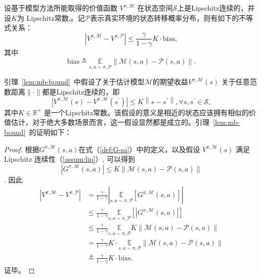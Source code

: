 \begin{lemma}\label{lem:mb-bound}
设基于模型方法所能取得的价值函数 ${V}^{\pi,\mathcal{M}}$ 在状态空间$\mathcal{S}$上是Lipschitz连续的，并设$K$为 Lipschitz常数,。记$\mathcal{P}$表示真实环境的状态转移概率分布，则有如下的不等式关系：
\begin{equation}
\left|{V}^{\pi, \mathcal{M}}-{V}^{\pi, \mathcal{P}}\right| \leq\frac{\gamma}{1-\gamma}K\cdot\mathrm{bias},
\end{equation}
其中
\begin{equation}
\mathrm{bias} \triangleq \underset{s,a\sim \pi,\mathcal{P}}{\mathbb{E}}\left\|\mathcal{M}(s, a)-\mathcal{P}(s, a)\right\|.
\end{equation}

\label{theo:mb-bound}
\end{lemma}

引理~\ref{lem:mb-bound}~中假设了关于估计模型$\mathcal{M}$的期望收益${V}^{\pi,\mathcal{M}}(s)$ 关于任意范数距离$\|\cdot\|$都是Lipschitz连续的，即
\begin{equation}\label{assum:lip}
    \left|{V}^{\pi,\mathcal{M}}(s)-{V}^{\pi,\mathcal{M}}(s^{\prime})\right| \leq K\left\|s-s^{\prime}\right\|, \forall s, s^{\prime} \in \mathcal{S},
\end{equation}
其中$K\in \mathbb{R}^+$ 是一个Lipschitz常数。该假设的意义是相近的状态应该拥有相似的价值估计，对于绝大多数场景而言，这一假设显然都是成立的。引理~\ref{lem:mb-bound}~的证明如下：

\begin{proof}

根据$G^{\pi,\mathcal{M}}(s,a)$在式（\ref{def:G-sa}）中的定义，以及假设 ${V}^{\pi,\mathcal{M}}(s)$ 满足 Lipschitz 连续性（\ref{assum:lip}）, 可以得到
\begin{equation}\label{eq:G-leq}
|G^{\pi,\mathcal{M}}(s,a)|\leq K\|\mathcal{M}(s,a)-\mathcal{P}(s,a)\|
\end{equation}.
因此
\begin{equation}
\begin{aligned}
\left|{V}^{\pi, \mathcal{M}}-{V}^{\pi, \mathcal{P}}\right| &= \frac{\gamma}{1-\gamma}\left|\underset{s,a\sim\pi,\mathcal{P}}{\mathbb{E}}\left[G^{\pi,\mathcal{M}}(s,a)\right]\right|\\
&\leq \frac{\gamma}{1-\gamma}\underset{s,a\sim\pi,\mathcal{P}}{\mathbb{E}}\left[\left|G^{\pi,\mathcal{M}}(s,a)\right|\right]\\
&\leq \frac{\gamma}{1-\gamma}\underset{s,a\sim\pi,\mathcal{P}}{\mathbb{E}}K\|\mathcal{M}(s,a)-\mathcal{P}(s,a)\|\\
&= \frac{\gamma}{1-\gamma}K\cdot\underset{s,a\sim\pi,\mathcal{P}}{\mathbb{E}}\|\mathcal{M}(s,a)-\mathcal{P}(s,a)\|\\
&\triangleq \frac{\gamma}{1-\gamma}K\cdot\mathrm{bias}.
\end{aligned}
\end{equation}
证毕。
\end{proof}

